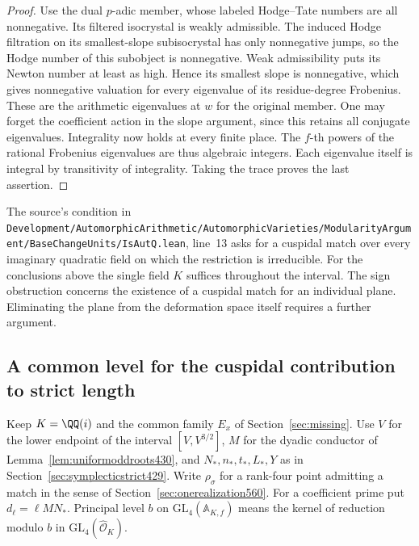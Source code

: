 \documentclass[a4paper,11pt]{article}
\theoremstyle{definition}
\theoremstyle{remark}
\newcommand{\srcloc}[2]{{\small\nolinkurl{#1.lean}}, line~#2}
\numberwithin{equation}{section}
\begin{document}
\begin{proof}
Use the dual \(p\)-adic member, whose labeled Hodge--Tate
numbers are all nonnegative. Its filtered isocrystal is weakly
admissible. The induced Hodge filtration on its smallest-slope
subisocrystal has only nonnegative jumps, so the Hodge number
of this subobject is nonnegative. Weak admissibility puts its
Newton number at least as high. Hence its smallest slope is
nonnegative, which gives nonnegative valuation for every
eigenvalue of its residue-degree Frobenius. These are the
arithmetic eigenvalues at \(w\) for the original member. One
may forget the coefficient action in the slope argument, since
this retains all conjugate eigenvalues. Integrality now holds
at every finite place. The \(f\)-th powers of the rational
Frobenius eigenvalues are thus algebraic integers. Each
eigenvalue itself is integral by transitivity of integrality.
Taking the trace proves the last assertion.
\end{proof}

The source's condition in
\srcloc{Development/AutomorphicArithmetic/AutomorphicVarieties/ModularityArgument/BaseChangeUnits/IsAutQ}{13}
asks for a cuspidal match over every imaginary quadratic field
on which the restriction is irreducible. For the conclusions
above the single field \(K\) suffices throughout the interval.
The sign obstruction concerns the existence of a cuspidal
match for an individual plane. Eliminating the plane from the
deformation space itself requires a further argument.


\subsection{A common level for the cuspidal contribution to strict length}
\label{sec:commonlevel561}

Keep \(K=\QQ(i)\) and the common family \(E_x\) of
Section~\ref{sec:missing}. Use \(V\) for the lower endpoint of
the interval \([V,V^{3/2}]\), \(M\) for the dyadic conductor
of Lemma~\ref{lem:uniformoddroots430}, and \(N_*,n_*,t_*,L_*,Y\)
as in Section~\ref{sec:symplecticstrict429}. Write \(\rho_\sigma\)
for a rank-four point admitting a match in the sense of
Section~\ref{sec:onerealization560}. For a coefficient prime
put \(d_\ell=\ell M N_*\). Principal level \(b\) on
\(\mathrm{GL}_4(\mathbb A_{K,f})\) means the kernel of reduction
modulo \(b\) in \(\mathrm{GL}_4(\widehat{\mathcal O}_K)\).
\end{document}
